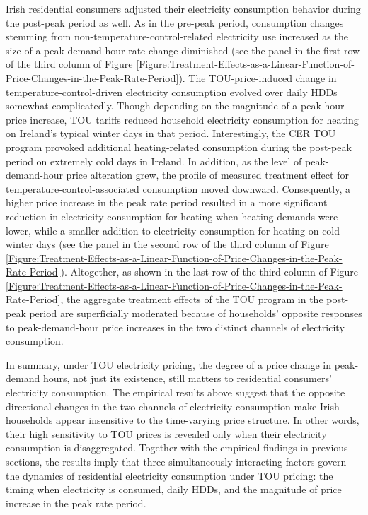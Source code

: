 Irish residential consumers adjusted their electricity consumption behavior during the post-peak period as well. As in the pre-peak period, consumption changes stemming from non-temperature-control-related electricity use increased as the size of a peak-demand-hour rate change diminished (see the panel in the first row of the third column of Figure \ref{Figure:Treatment-Effects-as-a-Linear-Function-of-Price-Changes-in-the-Peak-Rate-Period}). The TOU-price-induced change in temperature-control-driven electricity consumption evolved over daily HDDs somewhat complicatedly. Though depending on the magnitude of a peak-hour price increase, TOU tariffs reduced household electricity consumption for heating on Ireland's typical winter days in that period. Interestingly, the CER TOU program provoked additional heating-related consumption during the post-peak period on extremely cold days in Ireland. In addition, as the level of peak-demand-hour price alteration grew, the profile of measured treatment effect for temperature-control-associated consumption moved downward. Consequently, a higher price increase in the peak rate period resulted in a more significant reduction in electricity consumption for heating when heating demands were lower, while a smaller addition to electricity consumption for heating on cold winter days (see the panel in the second row of the third column of Figure \ref{Figure:Treatment-Effects-as-a-Linear-Function-of-Price-Changes-in-the-Peak-Rate-Period}). Altogether, as shown in the last row of the third column of Figure \ref{Figure:Treatment-Effects-as-a-Linear-Function-of-Price-Changes-in-the-Peak-Rate-Period}, the aggregate treatment effects of the TOU program in the post-peak period are superficially moderated because of households' opposite responses to peak-demand-hour price increases in the two distinct channels of electricity consumption.  

In summary, under TOU electricity pricing, the degree of a price change in peak-demand hours, not just its existence, still matters to residential consumers' electricity consumption. The empirical results above suggest that the opposite directional changes in the two channels of electricity consumption make Irish households appear insensitive to the time-varying price structure. In other words, their high sensitivity to TOU prices is revealed only when their electricity consumption is disaggregated. Together with the empirical findings in previous sections, the results imply that three simultaneously interacting factors govern the dynamics of residential electricity consumption under TOU pricing: the timing when electricity is consumed, daily HDDs, and the magnitude of price increase in the peak rate period.  
